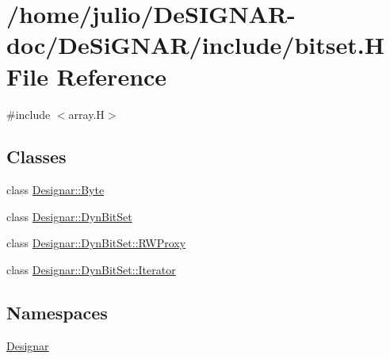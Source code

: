 \hypertarget{bitset_8_h}{}\section{/home/julio/\+De\+S\+I\+G\+N\+A\+R-\/doc/\+De\+Si\+G\+N\+A\+R/include/bitset.H File Reference}
\label{bitset_8_h}
{\ttfamily \#include $<$array.\+H$>$}\newline
\subsection*{Classes}
\begin{DoxyCompactItemize}
\item 
class \hyperlink{class_designar_1_1_byte}{Designar\+::\+Byte}
\item 
class \hyperlink{class_designar_1_1_dyn_bit_set}{Designar\+::\+Dyn\+Bit\+Set}
\item 
class \hyperlink{class_designar_1_1_dyn_bit_set_1_1_r_w_proxy}{Designar\+::\+Dyn\+Bit\+Set\+::\+R\+W\+Proxy}
\item 
class \hyperlink{class_designar_1_1_dyn_bit_set_1_1_iterator}{Designar\+::\+Dyn\+Bit\+Set\+::\+Iterator}
\end{DoxyCompactItemize}
\subsection*{Namespaces}
\begin{DoxyCompactItemize}
\item 
 \hyperlink{namespace_designar}{Designar}
\end{DoxyCompactItemize}
